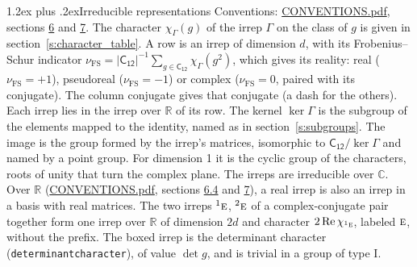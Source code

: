 \documentclass[10pt,a4paper]{article}
\makeatletter
\renewcommand\section{\@startsection{section}{1}{\z@}{-3ex plus -1ex minus -.2ex}%
  {1.2ex plus .2ex}{\normalfont\large\sffamily\bfseries\color{parttitle}}}
\numberwithin{equation}{section}
\newcommand{\grp}[1]{\mathsf{#1}}
\newcommand{\irr}[1]{\text{\normalfont\scshape #1}}
\newcommand{\conjpair}[1]{{}^{#1}}
\newcommand{\irchar}[1]{\chi_{#1}}
\newcommand{\fsind}{\nu_{\mathrm{FS}}}
\makeatother
\begin{document}
\section{Irreducible representations}\label{s:irreps}
Conventions: \href{../../CONVENTIONS.pdf}{CONVENTIONS.pdf}, sections \href{../../CONVENTIONS.pdf\#conv.6}{6} and \href{../../CONVENTIONS.pdf\#conv.7}{7}.
\leavevmode\label{n:function.character}\label{n:irrep.Gamma}The character $\irchar{\Gamma}(g)$ of the irrep $\Gamma$ on the class of $g$ is given in section~\ref{s:character_table}.
\leavevmode\label{n:index.dimension}\label{n:index.frobenius}\label{n:head.irrep}\label{n:head.reality}A row is an irrep of dimension $d$, with its Frobenius--Schur indicator $\fsind = |\grp{C_{12}}|^{-1}\allowbreak\sum_{g\in\grp{C_{12}}}\irchar{\Gamma}(g^2)$, which gives its reality: real ($\fsind = +1$), pseudoreal ($\fsind = -1$) or complex ($\fsind = 0$, paired with its conjugate). \label{n:head.conjugate}The column conjugate gives that conjugate (a dash for the others). \label{n:head.over.real}Each irrep lies in the irrep over $\mathbb{R}$ of its row. \label{n:head.kernel}The kernel $\ker\Gamma$ is the subgroup of the elements mapped to the identity, named as in section~\ref{s:subgroups}. \label{n:head.image}The image is the group formed by the irrep's matrices, isomorphic to $\grp{C_{12}}/\ker\Gamma$ and named by a point group. For dimension 1 it is the cyclic group of the characters, roots of unity that turn the complex plane. The irreps are irreducible over $\mathbb{C}$. Over $\mathbb{R}$ (\href{../../CONVENTIONS.pdf}{CONVENTIONS.pdf}, sections \href{../../CONVENTIONS.pdf\#conv.6.4}{6.4} and \href{../../CONVENTIONS.pdf\#conv.7}{7}), a real irrep is also an irrep in a basis with real matrices. The two irreps $\conjpair{1}\irr{e}$, $\conjpair{2}\irr{e}$ of a complex-conjugate pair together form one irrep over $\mathbb{R}$ of dimension $2d$ and character $2\operatorname{Re}\irchar{\conjpair{1}\irr{e}}$, labeled $\irr{e}$, without the prefix. \label{n:mark.determinant}The boxed irrep is the determinant character (\texttt{determinantcharacter}), of value $\det g$, and is trivial in a group of type I.
\setlength{\emergencystretch}{2em}\par\setlength{\emergencystretch}{0pt}
\end{document}
